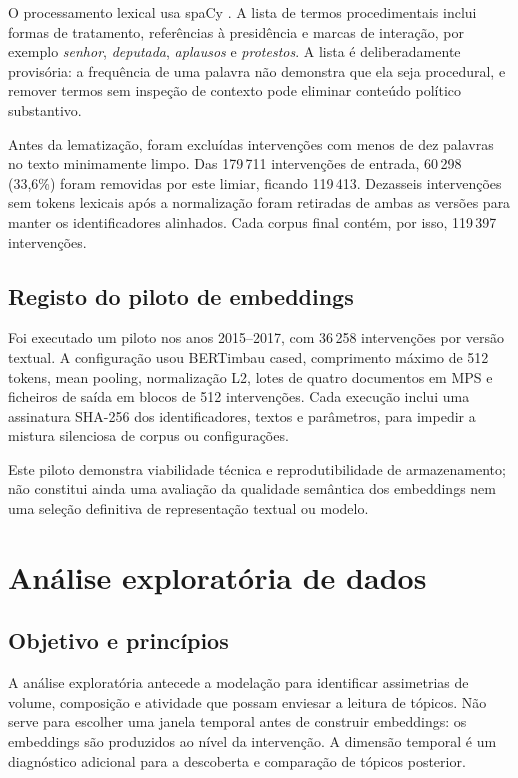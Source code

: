 \documentclass[11pt,a4paper]{article}
\begin{document}
O processamento lexical usa spaCy \citep{honnibal2020spacy}. A lista de termos procedimentais inclui formas de tratamento, referências à presidência e marcas de interação, por exemplo \emph{senhor}, \emph{deputada}, \emph{aplausos} e \emph{protestos}. A lista é deliberadamente provisória: a frequência de uma palavra não demonstra que ela seja procedural, e remover termos sem inspeção de contexto pode eliminar conteúdo político substantivo.

Antes da lematização, foram excluídas intervenções com menos de dez palavras no texto minimamente limpo. Das 179\,711 intervenções de entrada, 60\,298 (33,6\%) foram removidas por este limiar, ficando 119\,413. Dezasseis intervenções sem tokens lexicais após a normalização foram retiradas de ambas as versões para manter os identificadores alinhados. Cada corpus final contém, por isso, 119\,397 intervenções.

\subsection{Registo do piloto de embeddings}

Foi executado um piloto nos anos 2015--2017, com 36\,258 intervenções por versão textual. A configuração usou BERTimbau cased, comprimento máximo de 512 tokens, mean pooling, normalização L2, lotes de quatro documentos em MPS e ficheiros de saída em blocos de 512 intervenções. Cada execução inclui uma assinatura SHA-256 dos identificadores, textos e parâmetros, para impedir a mistura silenciosa de corpus ou configurações.

Este piloto demonstra viabilidade técnica e reprodutibilidade de armazenamento; não constitui ainda uma avaliação da qualidade semântica dos embeddings nem uma seleção definitiva de representação textual ou modelo.

\section{Análise exploratória de dados}

\subsection{Objetivo e princípios}

A análise exploratória antecede a modelação para identificar assimetrias de volume, composição e atividade que possam enviesar a leitura de tópicos. Não serve para escolher uma janela temporal antes de construir embeddings: os embeddings são produzidos ao nível da intervenção. A dimensão temporal é um diagnóstico adicional para a descoberta e comparação de tópicos posterior.
\end{document}
